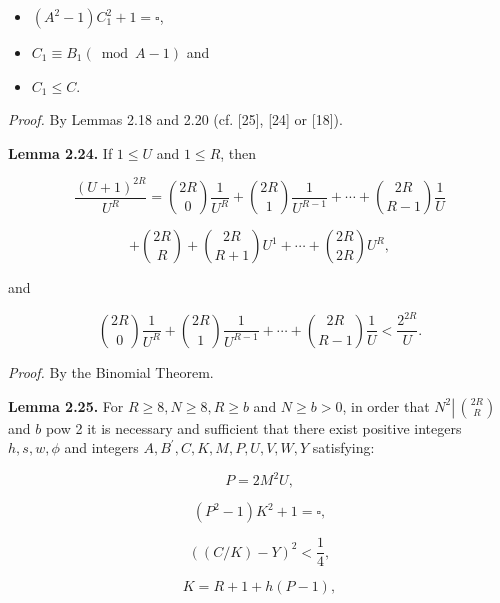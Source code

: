 \documentclass[11pt,a4paper]{article}
\begin{document}
\begin{itemize}
  \item[(i)] $\left(A^{2}-1\right) C_{1}^{2}+1=\square$,
  \item[(ii)] $C_{1} \equiv B_{1}(\bmod A-1)$ and
  \item[(iii)] $C_{1} \leq C$.
\end{itemize}

\noindent\emph{Proof.} By Lemmas 2.18 and 2.20 (cf. [25], [24] or [18]).

\noindent\textbf{Lemma 2.24.} If $1 \leq U$ and $1 \leq R$, then

\[
\frac{(U+1)^{2 R}}{U^{R}}=\binom{2 R}{0} \frac{1}{U^{R}}+\binom{2 R}{1} \frac{1}{U^{R-1}}+\cdots+\binom{2 R}{R-1} \frac{1}{U}
\]


\begin{equation*}
+\binom{2 R}{R}+\binom{2 R}{R+1} U^{1}+\cdots+\binom{2 R}{2 R} U^{R}, \tag{i}
\end{equation*}


and


\begin{equation*}
\binom{2 R}{0} \frac{1}{U^{R}}+\binom{2 R}{1} \frac{1}{U^{R-1}}+\cdots+\binom{2 R}{R-1} \frac{1}{U}<\frac{2^{2 R}}{U} . \tag{ii}
\end{equation*}


\noindent\emph{Proof.} By the Binomial Theorem.

\noindent\textbf{Lemma 2.25.} For $R \geq 8,\allowbreak  N \geq 8,\allowbreak  R \geq b$ and $N \geq b>0$, in order that $N^{2} \left\lvert\,\allowbreak \binom{ 2 R}{R}\right.$ and $b$ pow 2 it is necessary and sufficient that there exist positive integers $h,\allowbreak  s,\allowbreak  w,\allowbreak  \phi$ and integers $A,\allowbreak  B^{\prime},\allowbreak  C,\allowbreak  K,\allowbreak  M,\allowbreak  P,\allowbreak  U,\allowbreak  V,\allowbreak  W,\allowbreak  Y$ satisfying:


\begin{equation*}
P=2 M^{2} U, \tag{B1}
\end{equation*}

\begin{equation*}
\left(P^{2}-1\right) K^{2}+1=\square, \tag{B2}
\end{equation*}

\begin{equation*}
((C / K)-Y)^{2}<\frac{1}{4}, \tag{B3}
\end{equation*}

\begin{equation*}
K=R+1+h(P-1), \tag{B4}
\end{equation*}
\end{document}
